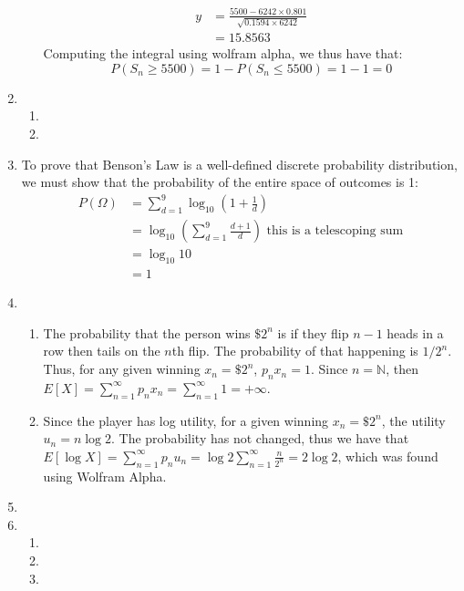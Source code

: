 \documentclass[letterpaper,12pt]{article}
\theoremstyle{definition}
\begin{document}
\begin{enumerate}
\begin{enumerate}
\begin{align*}
          y &= \frac{5500 - 6242\times 0.801}{\sqrt{0.1594\times 6242}} \\
          &= 15.8563
        \end{align*}
      Computing the integral using wolfram alpha, we thus have that:
        \begin{equation*}
          P(S_n \geq 5500) = 1 - P(S_n \leq 5500) = 1 - 1 = 0
        \end{equation*}
    \end{enumerate}
  \item
    \begin{enumerate}
      \item
      \item
    \end{enumerate}
  \item
    To prove that Benson's Law is a well-defined discrete probability distribution, we must show that the probability of the entire space of outcomes is 1:
      \begin{align*}
        P(\Omega) &= \sum_{d = 1}^9 \log_{10} (1+\frac{1}{d}) \\
        &= \log_{10} (\sum_{d = 1}^9 \frac{d+1}{d}) \text{ this is a telescoping sum} \\
        &= \log_{10} 10 \\
        &= 1
      \end{align*}
  \item
    \begin{enumerate}
      \item
        The probability that the person wins $\$2^n$ is if they flip $n-1$ heads in a row then tails on the $n$th flip. The probability of that happening is $1/2^n$. Thus, for any given winning $x_n = \$2^n$, $p_nx_n = 1$. Since $n = \mathds{N}$, then $E[X] = \sum_{n = 1}^\infty p_nx_n = \sum_{n = 1}^\infty 1 = + \infty$.
      \item
        Since the player has log utility, for a given winning $x_n = \$2^n$, the utility $u_n = n\log{2}$. The probability has not changed, thus we have that $E[\log{X}] = \sum_{n = 1}^\infty p_nu_n = \log{2} \sum_{n = 1}^\infty \frac{n}{2^n} = 2\log{2}$, which was found using Wolfram Alpha.
    \end{enumerate}
  \item
  \item
    \begin{enumerate}
      \item
      \item
      \item

\end{enumerate}
\end{enumerate}
\end{document}
